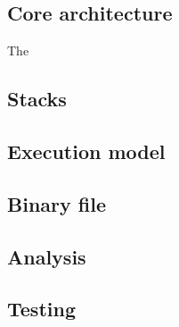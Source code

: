 \subsection{Core architecture}
The

\subsection{Stacks}

\subsection{Execution model}

\subsection{Binary file}








\subsection{Analysis}

\subsection{Testing}
